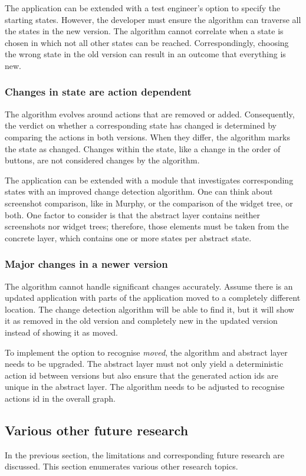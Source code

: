 The application can be extended with a test engineer's option to specify the starting states. However, the developer must ensure the algorithm can traverse all the states in the new version. The algorithm cannot correlate when a state is chosen in which not all other states can be reached. Correspondingly, choosing the wrong state in the old version can result in an outcome that everything is new. 

\subsubsection{Changes in state are action dependent}
The algorithm evolves around actions that are removed or added. Consequently, the verdict on whether a corresponding state has changed is determined by comparing the actions in both versions. When they differ, the algorithm marks the state as changed. Changes within the state, like a change in the order of buttons, are not considered changes by the algorithm. 

The application can be extended with a module that investigates corresponding states with an improved change detection algorithm. One can think about screenshot comparison, like in Murphy, or the comparison of the widget tree, or both. One factor to consider is that the abstract layer contains neither screenshots nor widget trees; therefore, those elements must be taken from the concrete layer, which contains one or more states per abstract state. 

\subsubsection{Major changes in a newer version}
The algorithm cannot handle significant changes accurately. Assume there is an updated application with parts of the application moved to a completely different location. The change detection algorithm will be able to find it, but it will show it as removed in the old version and completely new in the updated version instead of showing it as moved. 

To implement the option to recognise \textit{moved}, the algorithm and abstract layer needs to be upgraded. The abstract layer must not only yield a deterministic action id between versions but also ensure that the generated action ids are unique in the abstract layer. The algorithm needs to be adjusted to recognise actions id in the overall graph. 
 
\subsection{Various other future research}
In the previous section, the limitations and corresponding future research are discussed. This section enumerates various other research topics.

